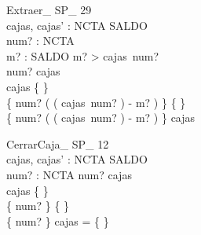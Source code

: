 
\begin{schema}{Extraer\_ SP\_ 29}\\
 cajas, cajas' : NCTA \pfun SALDO \\
 num? : NCTA \\
 m? : SALDO 
\where
 m? > cajas~num? \\
 num? \in \dom cajas \\
 cajas \neq \{ \} \\
 \{ num? \mapsto ( ( cajas~num? ) - m? ) \} \neq \{ \} \\
 \dom \{ num? \mapsto ( ( cajas~num? ) - m? ) \} \subset \dom cajas
\end{schema}

\begin{schema}{CerrarCaja\_ SP\_ 12}\\
 cajas, cajas' : NCTA \pfun SALDO \\
 num? : NCTA 
\where
 num? \notin \dom cajas \\
 cajas \neq \{ \} \\
 \{ num? \} \neq \{ \} \\
 \{ num? \} \cap \dom cajas = \{ \}
\end{schema}

